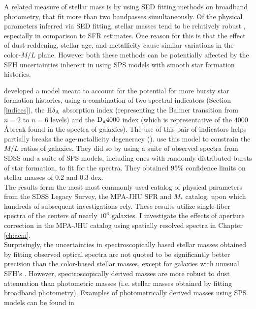 A related measure of stellar mass is by using SED fitting methods on
broadband photometry, that fit more than two bandpasses
simultaneously. Of the physical parameters inferred via SED fitting,
stellar masses tend to be relatively robust
\citep{2001ApJ...559..620P, 2009ApJ...701.1839M}, especially in
comparison to SFR estimates. One reason for this is that the effect of
dust-reddening, stellar age, and metallicity cause similar variations
in the color-$M/L$ plane.  However both these methods can be
potentially affected by the SFH uncertainties inherent in using SPS
models with smooth star formation histories.

\citet{kauffmann_stellar_2003} developed a model meant to account for
the potential for more bursty star formation histories, using a
combination of two spectral indicators (Section \ref{indices}), the
${\rm H}\delta_{\rm A}$ absorption index (representing the Balmer
transition from $n = 2$ to $n = 6$ levels) and the ${\rm D}_{\rm n}
4000$ index (which is representative of the $4000$ \AA break found in
the spectra of galaxies).  The use of this pair of indicators helps
partially breaks the age-metallicity degeneracy
(\citealt{worthey_comprehensive_1994}). \citet{kauffmann_stellar_2003}
use this model to constrain the $M/L$ ratios of galaxies. They did so
by using a suite of observed spectra from SDSS and a suite of SPS
models, including ones with randomly distributed bursts of star
formation, to fit for the spectra. They obtained 95\% confidence
limits on stellar masses of 0.2 and 0.3 dex.\\

The \citet{kauffman_stellar_2003} results form the most most commonly
used catalog of physical parameters from the SDSS Legacy Survey, the
MPA-JHU SFR and $M_{*}$ catalog, upon which hundreds of subsequent
investigations rely. These results utilize single-fiber spectra of the
centers of nearly $10^6$ galaxies. I investigate the effects of
aperture correction in the MPA-JHU catalog using spatially resolved
spectra in Chapter \ref{ch:acm}.\\

Surprisingly, the uncertainties in spectroscopically based stellar
masses obtained by fitting observed optical spectra
\citep{kauffmann_stellar_2003, 2012MNRAS.421..314C} are not quoted to
be significantly better precision than the color-based stellar masses,
except for galaxies with unusual SFH's
\citet{2005MNRAS.362...41G}. However, spectroscopically derived masses
are more robust to dust attenuation than photometric masses
(i.e. stellar masses obtained by fitting broadband
photometry). Examples of photometrically derived masses using SPS
models can be found in \citet{2004ApJ...616L.103D,
  2007AJ....133..734B}\\

